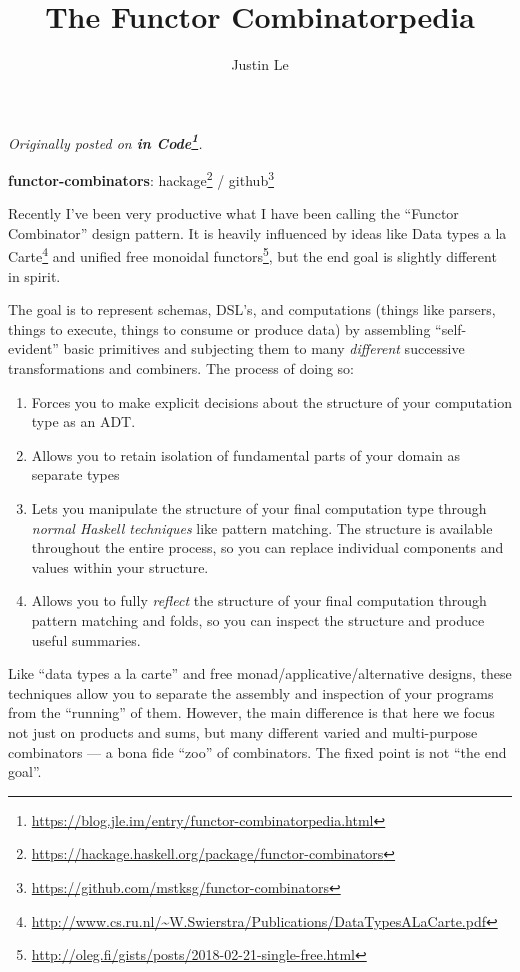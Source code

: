 \documentclass[]{article}
\title{The Functor Combinatorpedia}
\author{Justin Le}
\renewcommand{\href}[2]{#2\footnote{\url{#1}}}
\begin{document}
\maketitle

\emph{Originally posted on
\textbf{\href{https://blog.jle.im/entry/functor-combinatorpedia.html}{in
Code}}.}

\textbf{functor-combinators}:
\href{https://hackage.haskell.org/package/functor-combinators}{hackage} /
\href{https://github.com/mstksg/functor-combinators}{github}

Recently I've been very productive what I have been calling the ``Functor
Combinator'' design pattern. It is heavily influenced by ideas like
\href{http://www.cs.ru.nl/~W.Swierstra/Publications/DataTypesALaCarte.pdf}{Data
types a la Carte} and
\href{http://oleg.fi/gists/posts/2018-02-21-single-free.html}{unified free
monoidal functors}, but the end goal is slightly different in spirit.

The goal is to represent schemas, DSL's, and computations (things like parsers,
things to execute, things to consume or produce data) by assembling
``self-evident'' basic primitives and subjecting them to many \emph{different}
successive transformations and combiners. The process of doing so:

\begin{enumerate}
\def\labelenumi{\arabic{enumi}.}
\tightlist
\item
  Forces you to make explicit decisions about the structure of your computation
  type as an ADT.
\item
  Allows you to retain isolation of fundamental parts of your domain as separate
  types
\item
  Lets you manipulate the structure of your final computation type through
  \emph{normal Haskell techniques} like pattern matching. The structure is
  available throughout the entire process, so you can replace individual
  components and values within your structure.
\item
  Allows you to fully \emph{reflect} the structure of your final computation
  through pattern matching and folds, so you can inspect the structure and
  produce useful summaries.
\end{enumerate}

Like ``data types a la carte'' and free monad/applicative/alternative designs,
these techniques allow you to separate the assembly and inspection of your
programs from the ``running'' of them. However, the main difference is that here
we focus not just on products and sums, but many different varied and
multi-purpose combinators --- a bona fide ``zoo'' of combinators. The fixed
point is not ``the end goal''.
\end{document}
